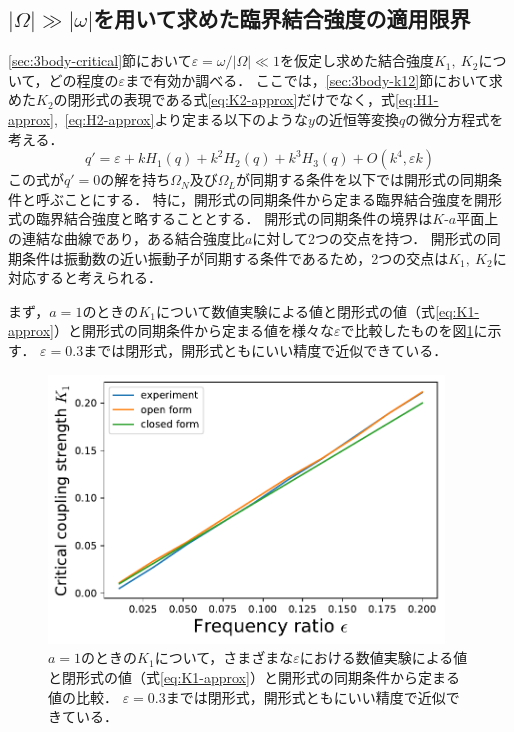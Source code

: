 \documentclass[../main]{subfiles}
\begin{document}
\subsection{$|\Omega|\gg|\omega|$を用いて求めた臨界結合強度の適用限界}
\ref{sec:3body-critical}節において$\varepsilon=\omega/|\Omega|\ll 1$を仮定し求めた結合強度$K_1,\ K_2$について，どの程度の$\varepsilon$まで有効か調べる．
ここでは，\ref{sec:3body-k12}節において求めた$K_2$の閉形式の表現である式\eqref{eq:K2-approx}だけでなく，式\eqref{eq:H1-approx},\ \eqref{eq:H2-approx}より定まる以下のような$y$の近恒等変換$q$の微分方程式を考える．
\begin{equation}
    \label{eq:k1k2-open}
    q'=\varepsilon+kH_1(q)+k^2H_2(q)+k^3H_3(q)+O(k^4,\varepsilon k)
\end{equation}
この式が$q'=0$の解を持ち$\Omega_N$及び$\Omega_L$が同期する条件を以下では開形式の同期条件と呼ぶことにする．
特に，開形式の同期条件から定まる臨界結合強度を開形式の臨界結合強度と略することとする．
開形式の同期条件の境界は$K$-$a$平面上の連結な曲線であり，ある結合強度比$a$に対して2つの交点を持つ．
開形式の同期条件は振動数の近い振動子が同期する条件であるため，2つの交点は$K_1,\ K_2$に対応すると考えられる．

まず，$a=1$のときの$K_1$について数値実験による値と閉形式の値（式\eqref{eq:K1-approx}）と開形式の同期条件から定まる値を様々な$\varepsilon$で比較したものを図\ref{fig:k1-compare}に示す．
$\varepsilon=0.3$までは閉形式，開形式ともにいい精度で近似できている．

\begin{figure}[tbp]
\centering
\includegraphics[width=105mm]{./images/k1-compare.pdf}
\centering
\caption{$a=1$のときの$K_1$について，さまざまな$\varepsilon$における数値実験による値と閉形式の値（式\eqref{eq:K1-approx}）と開形式の同期条件から定まる値の比較．
$\varepsilon=0.3$までは閉形式，開形式ともにいい精度で近似できている．}
\label{fig:k1-compare}
\end{figure}
\end{document}

